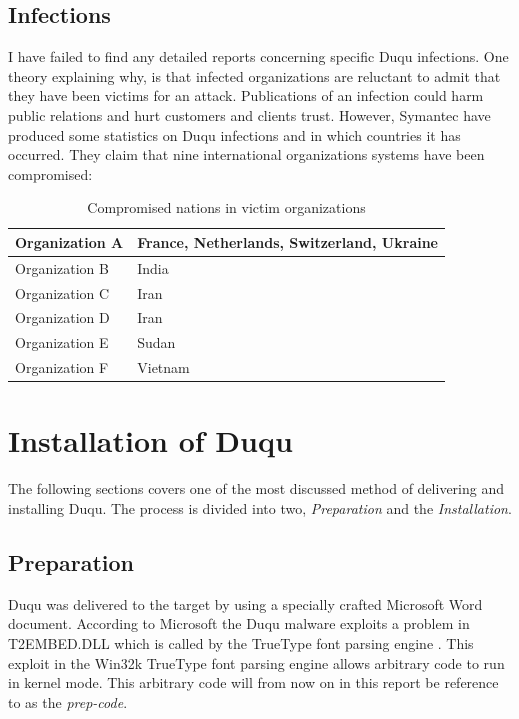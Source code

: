 \documentclass[11pt,english,a4paper]{report}
\begin{document}
\section{Infections}
I have failed to find any detailed reports concerning specific Duqu infections. One theory explaining why, is that infected organizations are reluctant to admit that they have been victims for an attack. Publications of an infection could harm public relations and hurt customers and clients trust. However, Symantec have produced some statistics on Duqu infections and in which countries it has occurred. They claim that nine international organizations systems have been compromised:
\begin{table}[h]
        \caption{Compromised nations in victim organizations \cite{DUQU_SYMANTEC}}
        \begin{tabular}{|l|l|}
        \hline
        Organization A & France, Netherlands, Switzerland, Ukraine  \\ \hline
        Organization B & India  \\ \hline
        Organization C & Iran  \\ \hline
        Organization D & Iran  \\ \hline
        Organization E & Sudan  \\ \hline
        Organization F & Vietnam  \\ \hline
        \end{tabular}
      \end{table}

\chapter{Installation of Duqu}
The following sections covers one of the most discussed method of delivering and installing Duqu. The process is divided into two, \textit{Preparation} and the \textit{Installation}.

\section{Preparation}
Duqu was delivered to the target by using a specially crafted Microsoft Word document. According to Microsoft the Duqu malware exploits a problem in T2EMBED.DLL which is called by the TrueType font parsing engine \cite{RYAN_ZDNET}. This exploit in the Win32k TrueType font parsing engine allows arbitrary code to run in kernel mode. This arbitrary code will from now on in this report be reference to as the \textit{prep-code}. 
\end{document}
